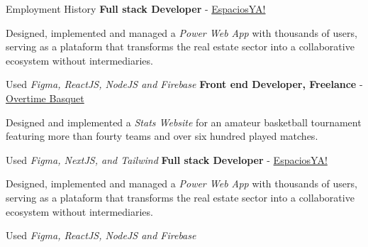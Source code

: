 \begin{rubric}{Employment History}
\entry*[2021 -- 2022]%
	\textbf{Full stack Developer} - {\href{http://www.espaciosya.com}{EspaciosYA!}}\par
	Designed, implemented and managed a \emph{Power Web App} with thousands of users, serving as a plataform that transforms the real estate sector into a collaborative ecosystem without intermediaries.\par
    Used \emph{Figma, ReactJS, NodeJS and Firebase}
%
%
\entry*[2022 -- 2023]%
	\textbf{Front end Developer, Freelance} - {\href{http://www.overtimebasquet.com}{Overtime Basquet}}\par
    Designed and implemented a \emph{Stats Website} for an amateur basketball tournament featuring more than fourty teams and over six hundred played matches.\par
    Used \emph{Figma, NextJS, and Tailwind}
%
%
\entry*[2023 -- 2024]%
	\textbf{Full stack Developer} - {\href{http://www.espaciosya.com}{EspaciosYA!}}\par
	Designed, implemented and managed a \emph{Power Web App} with thousands of users, serving as a plataform that transforms the real estate sector into a collaborative ecosystem without intermediaries.\par
    Used \emph{Figma, ReactJS, NodeJS and Firebase}
%
\end{rubric}